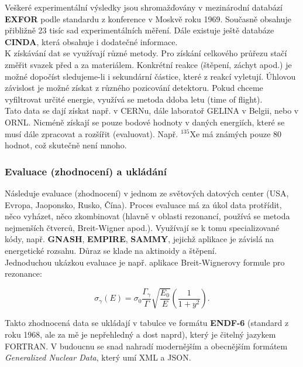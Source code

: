 Veškeré experimentální výsledky jsou shromažďovány v mezinárodní databází \textbf{EXFOR} podle standardu z konference v Moskvě roku 1969. Současně obsahuje přibližně 23 tisíc sad experimentálních měření. Dále existuje ještě databáze \textbf{CINDA}, která obsahuje i dodatečné informace. \\

K získávání dat se využívají různé metody. Pro získání celkového průřezu stačí změřit svazek před a za materiálem. Konkrétní reakce (štěpení, záchyt apod.) je možné dopočíst sledujeme-li i sekundární částice, které z reakcí vyletují. Úhlovou závislost je možné získat z různého pozicování detektoru. Pokud chceme vyfiltrovat určité energie, využívá se metoda ddoba letu (time of flight).\\

Tato data se dají získat např. v CERNu, dále laboratoř GELINA v Belgii, nebo v ORNL. Nicméně získají se pouze bodové hodnoty v daných energiích, které se musí dále zpracovat a rozšířit (evaluovat). Např. $^{135}$Xe má známých pouze 80 hodnot, což skutečně není mnoho.

\subsubsection{Evaluace (zhodnocení) a ukládání}

Následuje evaluace (zhodnocení) v jednom ze světových datových center (USA, Evropa, Jaoponsko, Rusko, Čína). Proces evaluace má za úkol data protřídit, něco vyházet, něco zkombinovat (hlavně v oblasti rezonancí, používá se metoda nejmenších čtverců, Breit-Wigner apod.). Využívají se k tomu specializované kódy, např. \textbf{GNASH}, \textbf{EMPIRE}, \textbf{SAMMY}, jejichž aplikace je závislá na energetické rozsahu. Důraz se klade na aktinoidy a štěpení.\\

Jednoduchou ukázkou evaluace je např. aplikace Breit-Wignerovy formule pro rezonance:

\begin{equation}
  \sigma_\gamma(E) = \sigma_0 \dfrac{\Gamma_\gamma}{\Gamma} \sqrt{\dfrac{E_0}{E}} \left ( \dfrac{1}{1+y^2} \right ).
\end{equation}

Takto zhodnocená data se ukládají v tabulce ve formátu \textbf{ENDF-6} (standard z roku 1968, ale za mě je nepřehledný a dost naprd), který je čitelný jazykem FORTRAN. V budoucnu se snad  nahradí modernějším a obecnějším formátem \textit{Generalized Nuclear Data}, který umí XML a JSON.

